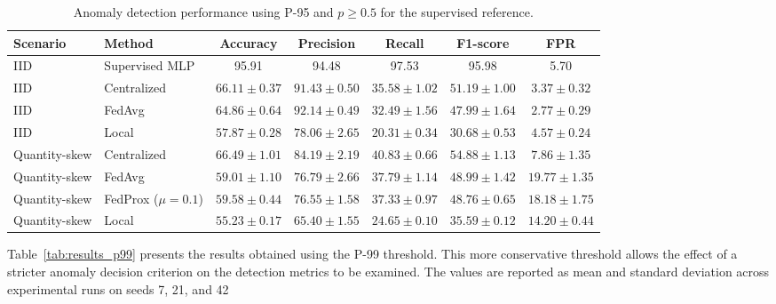 \documentclass[12pt]{article}
\begin{document}
\begin{table}[h!]
	\centering
	\caption{Anomaly detection performance using P-95  and $p \ge 0.5$ for the supervised reference.}
	\label{tab:results_p95}
	\begin{tabular}{llccccc}
		\toprule
		\textbf{Scenario} & \textbf{Method} & \textbf{Accuracy} & \textbf{Precision} & \textbf{Recall} & \textbf{F1-score} & \textbf{FPR} \\
		\midrule

		IID & Supervised MLP & 95.91 & 94.48 & 97.53 & 95.98 & 5.70 \\
		\midrule
		IID & Centralized & $66.11 \pm 0.37$ & $91.43 \pm 0.50$ & $35.58 \pm 1.02$ & $51.19 \pm 1.00$ & $3.37 \pm 0.32$ \\
		IID & FedAvg & $64.86 \pm 0.64$ & $92.14 \pm 0.49$ & $32.49 \pm 1.56$ & $47.99 \pm 1.64$ & $2.77 \pm 0.29$ \\
		IID & Local & $57.87 \pm 0.28$ & $78.06 \pm 2.65$ & $20.31 \pm 0.34$ & $30.68 \pm 0.53$ & $4.57 \pm 0.24$ \\
		\midrule
		Quantity-skew & Centralized & $66.49 \pm 1.01$ & $84.19 \pm 2.19$ & $40.83 \pm 0.66$ & $54.88 \pm 1.13$ & $7.86 \pm 1.35$ \\
		Quantity-skew & FedAvg & $59.01 \pm 1.10$ & $76.79 \pm 2.66$ & $37.79 \pm 1.14$ & $48.99 \pm 1.42$ & $19.77 \pm 1.35$ \\
		Quantity-skew & FedProx ($\mu=0.1$) & $59.58 \pm 0.44$ & $76.55 \pm 1.58$ & $37.33 \pm 0.97$ & $48.76 \pm 0.65$ & $18.18 \pm 1.75$ \\
		Quantity-skew & Local & $55.23 \pm 0.17$ & $65.40 \pm 1.55$ & $24.65 \pm 0.10$ & $35.59 \pm 0.12$ & $14.20 \pm 0.44$ \\
		\bottomrule
	\end{tabular}
\end{table}

Table~\ref{tab:results_p99} presents the results obtained using the P-99 threshold. This more conservative threshold allows the effect of a stricter anomaly decision criterion on the detection metrics to be examined.  The values are reported as mean and standard deviation across experimental runs on seeds 7, 21, and 42
\end{document}
